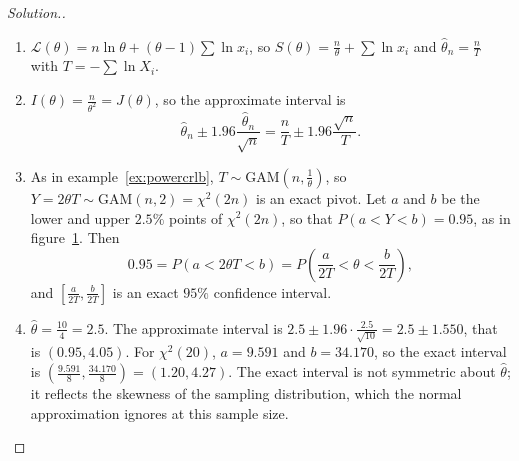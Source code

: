 \documentclass[12pt,a4paper]{report}
\theoremstyle{definition}
\newenvironment{solution}
  {\renewcommand{\qedsymbol}{}\begin{proof}[\textit{Solution}.]}
  {\end{proof}}
\begin{document}
\begin{solution}
\begin{enumerate}
\item[(a)] $\mathcal{L}(\theta) = n\ln\theta + (\theta - 1)\sum\ln x_i$, so
$S(\theta) = \frac n\theta + \sum\ln x_i$ and $\hat\theta_n = \frac nT$ with
$T = -\sum\ln X_i$.
\item[(b)] $I(\theta) = \frac{n}{\theta^2} = J(\theta)$, so the approximate interval is
\[\hat\theta_n\pm 1.96\frac{\hat\theta_n}{\sqrt n} = \frac nT\pm 1.96\frac{\sqrt n}{T} .\]
\item[(c)] As in example~\ref{ex:powercrlb}, $T\sim\text{GAM}\left(n, \frac1\theta\right)$, so
$Y = 2\theta T\sim\text{GAM}(n, 2) = \chi^2(2n)$ is an exact pivot. Let $a$ and $b$ be
the lower and upper $2.5\%$ points of $\chi^2(2n)$, so that $P(a<Y<b) = 0.95$, as in
figure~\ref{fig:chisqtails}. Then
\[0.95 = P(a<2\theta T<b) = P\left(\frac{a}{2T}<\theta<\frac{b}{2T}\right),\]
and $\left[\frac{a}{2T}, \frac{b}{2T}\right]$ is an exact $95\%$ confidence interval.
\item[(d)] $\hat\theta = \frac{10}{4} = 2.5$. The approximate interval is
$2.5\pm 1.96\cdot\frac{2.5}{\sqrt{10}} = 2.5\pm 1.550$, that is $(0.95, 4.05)$. For
$\chi^2(20)$, $a = 9.591$ and $b = 34.170$, so the exact interval is
$\left(\frac{9.591}{8}, \frac{34.170}{8}\right) = (1.20, 4.27)$. The exact interval is
not symmetric about $\hat\theta$; it reflects the skewness of the sampling
distribution, which the normal approximation ignores at this sample size.
\end{enumerate}
\end{solution}

\begin{figure}[H]
\centering
{}
\label{fig:chisqtails}
\end{figure}
\end{document}
